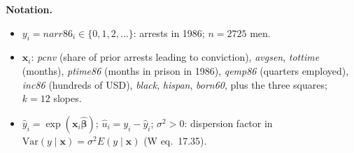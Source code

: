 \documentclass[11pt,a4paper]{article}
\numberwithin{equation}{questao}   %
\newenvironment{notacao}{\par\smallskip\noindent\textbf{Notation.}\begin{itemize}[leftmargin=1.4em,topsep=1pt,itemsep=0pt]\small}{\end{itemize}}
\begin{document}
\begin{sol}
\begin{notacao}
\item $y_i=\textit{narr86}_i\in\{0,1,2,\dots\}$: arrests in 1986; $n=2725$ men.
\item $\mathbf x_i$: \textit{pcnv} (share of prior arrests leading to conviction), \textit{avgsen},
  \textit{tottime} (months), \textit{ptime86} (months in prison in 1986), \textit{qemp86} (quarters
  employed), \textit{inc86} (hundreds of USD), \textit{black}, \textit{hispan}, \textit{born60}, plus the
  three squares; $k=12$ slopes.
\item $\hat y_i=\exp(\mathbf x_i\hat{\boldsymbol\beta})$; $\hat u_i=y_i-\hat y_i$; $\sigma^2>0$:
  dispersion factor in $\mathrm{Var}(y\mid\mathbf x)=\sigma^2E(y\mid\mathbf x)$ (W eq.~17.35).
\end{notacao}


\end{sol}
\end{document}
